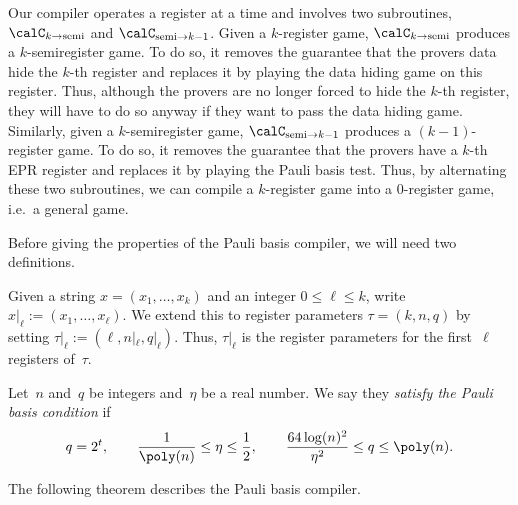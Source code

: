 \documentclass[11pt]{article}
\newcommand{\shorten}[2]{#1|_{#2}}
\begin{document}
Our compiler operates a register at a time and involves two subroutines, $\calC_{k \rightarrow \mathrm{semi}}$ and $\calC_{\mathrm{semi}\rightarrow k-1}$.
Given a $k$-register game, $\calC_{k\rightarrow \mathrm{semi}}$ produces a $k$-semiregister game.
To do so, it removes the guarantee that the provers data hide the $k$-th register and replaces it by playing the data hiding game on this register.
Thus, although the provers are no longer forced to hide the $k$-th register, they will have to do so anyway if they want to pass the data hiding game.
Similarly, given a $k$-semiregister game, $\calC_{\mathrm{semi}\rightarrow k-1}$ produces a $(k-1)$-register game.
To do so, it removes the guarantee that the provers have a $k$-th EPR register and replaces it by playing the Pauli basis test.
Thus, by alternating these two subroutines, we can compile a $k$-register game into a $0$-register game, i.e.\ a general game.


Before giving the properties of the Pauli basis compiler, we will need two definitions.

\begin{definition}
Given a string $x = (x_1, \ldots, x_k)$ and an integer $0 \leq \ell \leq k$, write $\shorten{x}{\ell} := (x_1, \ldots, x_\ell)$.
We extend this to register parameters $\tau = (k, n, q)$ by setting 
$\shorten{\tau}{\ell} := (\ell, \shorten{n}{\ell}, \shorten{q}{\ell})$.
Thus, $\shorten{\tau}{\ell}$ is the register parameters for the first~$\ell$ registers of~$\tau$.
\end{definition}

\begin{definition}
Let~$n$ and~$q$ be integers and~$\eta$ be a real number. We say they \emph{satisfy the Pauli basis condition} if
\begin{equation*}
q = 2^t,\qquad
\frac{1}{\mathrm{\poly}(n)} \leq \eta \leq \frac{1}{2},
\qquad \frac{64 \log(n)^2}{\eta^2} \leq q \leq \poly(n).
\end{equation*}
\end{definition}

The following theorem describes the Pauli basis compiler.
\end{document}
